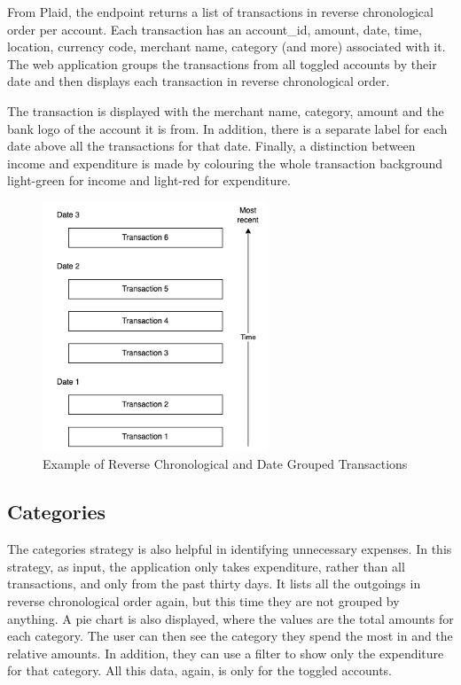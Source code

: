 From Plaid, the endpoint returns a list of transactions in reverse chronological order per account. Each transaction has an account\_id, amount, date, time, location, currency code, merchant name, category (and more) associated with it. The web application groups the transactions from all toggled accounts by their date and then displays each transaction in reverse chronological order.

The transaction is displayed with the merchant name, category, amount and the bank logo of the account it is from. In addition, there is a separate label for each date above all the transactions for that date. Finally, a distinction between income and expenditure is made by colouring the whole transaction background light-green for income and light-red for expenditure.

\begin{figure}[H]
	\centering
	\includegraphics[width=0.6\textwidth]{images/transaction_labels.png}
	\caption{Example of Reverse Chronological and Date Grouped Transactions}
	\label{fig:TransactionLabels}
\end{figure}

\subsection{Categories}
The categories strategy is also helpful in identifying unnecessary expenses. In this strategy, as input, the application only takes expenditure, rather than all transactions, and only from the past thirty days. It lists all the outgoings in reverse chronological order again, but this time they are not grouped by anything. A pie chart is also displayed, where the values are the total amounts for each category. The user can then see the category they spend the most in and the relative amounts. In addition, they can use a filter to show only the expenditure for that category. All this data, again, is only for the toggled accounts.

